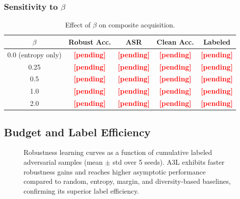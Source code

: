 \documentclass[review,1p,times,number]{elsarticle}
\newcommand{\TODO}[1]{\textcolor{red}{\textbf{[#1]}}}
\begin{document}
\subsubsection{Sensitivity to $\beta$}

\begin{table}[htbp]
\caption{Effect of $\beta$ on composite acquisition.}
\label{tab:beta}
\centering
\begin{tabular}{@{}ccccc@{}}
\toprule
$\beta$ & \textbf{Robust Acc.} & \textbf{ASR}
  & \textbf{Clean Acc.} & \textbf{Labeled} \\
\midrule
0.0 (entropy only) & \TODO{pending} & \TODO{pending} & \TODO{pending} & \TODO{pending} \\
0.25               & \TODO{pending} & \TODO{pending} & \TODO{pending} & \TODO{pending} \\
0.5                & \TODO{pending} & \TODO{pending} & \TODO{pending} & \TODO{pending} \\
1.0                & \TODO{pending} & \TODO{pending} & \TODO{pending} & \TODO{pending} \\
2.0                & \TODO{pending} & \TODO{pending} & \TODO{pending} & \TODO{pending} \\
\bottomrule
\end{tabular}
\end{table}

\subsection{Budget and Label Efficiency}
\label{sec:efficiency}

\begin{figure}[htbp]
\centering
\caption{Robustness learning curves as a function of cumulative labeled
  adversarial samples (mean $\pm$ std over 5 seeds). A3L exhibits faster
  robustness gains and reaches higher asymptotic performance compared to
  random, entropy, margin, and diversity-based baselines, confirming its
  superior label efficiency.}
\label{fig:robustness_curves}
\end{figure}
\end{document}
